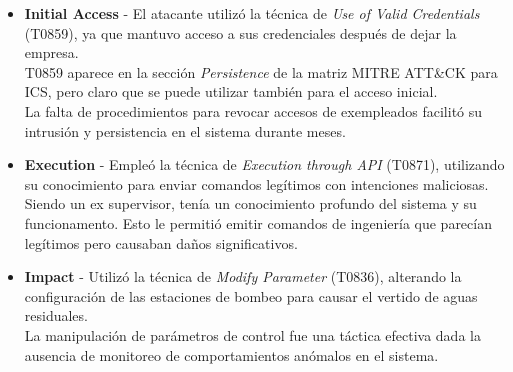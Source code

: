 \begin{itemize}
    \item \textbf{Initial Access} - El atacante utilizó la técnica de \textit{Use of Valid Credentials} (T0859), ya que mantuvo acceso a sus credenciales después de dejar la empresa.\\
    T0859 aparece en la sección \textit{Persistence} de la matriz MITRE ATT\&CK para ICS, pero claro que se puede utilizar también para el acceso inicial.\\
    La falta de procedimientos para revocar accesos de exempleados facilitó su intrusión y persistencia en el sistema durante meses.
    
    
    \item \textbf{Execution} - Empleó la técnica de \textit{Execution through API} (T0871), utilizando su conocimiento para enviar comandos legítimos con intenciones maliciosas.\\
    Siendo un ex supervisor, tenía un conocimiento profundo del sistema y su funcionamento. Esto le permitió emitir comandos de ingeniería que parecían legítimos pero causaban daños significativos.
    
    \item \textbf{Impact} - Utilizó la técnica de \textit{Modify Parameter} (T0836), alterando la configuración de las estaciones de bombeo para causar el vertido de aguas residuales.\\
    La manipulación de parámetros de control fue una táctica efectiva dada la ausencia de monitoreo de comportamientos anómalos en el sistema.
\end{itemize}


    
    
    
